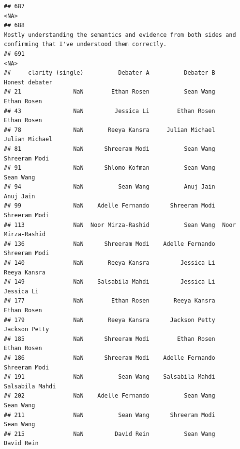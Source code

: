 \documentclass[
]{article}
\begin{document}
\begin{verbatim}
## 687                                                                                                                                                                                                                                                                                                                                                <NA>
## 688                                                                                                                                                                                                                                 Mostly understanding the semantics and evidence from both sides and confirming that I've understood them correctly.
## 691                                                                                                                                                                                                                                                                                                                                                <NA>
##     clarity (single)          Debater A          Debater B     Honest debater
## 21               NaN        Ethan Rosen          Sean Wang        Ethan Rosen
## 43               NaN         Jessica Li        Ethan Rosen        Ethan Rosen
## 78               NaN       Reeya Kansra     Julian Michael     Julian Michael
## 81               NaN      Shreeram Modi          Sean Wang      Shreeram Modi
## 91               NaN      Shlomo Kofman          Sean Wang          Sean Wang
## 94               NaN          Sean Wang          Anuj Jain          Anuj Jain
## 99               NaN    Adelle Fernando      Shreeram Modi      Shreeram Modi
## 113              NaN  Noor Mirza-Rashid          Sean Wang  Noor Mirza-Rashid
## 136              NaN      Shreeram Modi    Adelle Fernando      Shreeram Modi
## 140              NaN       Reeya Kansra         Jessica Li       Reeya Kansra
## 149              NaN    Salsabila Mahdi         Jessica Li         Jessica Li
## 177              NaN        Ethan Rosen       Reeya Kansra        Ethan Rosen
## 179              NaN       Reeya Kansra      Jackson Petty      Jackson Petty
## 185              NaN      Shreeram Modi        Ethan Rosen        Ethan Rosen
## 186              NaN      Shreeram Modi    Adelle Fernando      Shreeram Modi
## 191              NaN          Sean Wang    Salsabila Mahdi    Salsabila Mahdi
## 202              NaN    Adelle Fernando          Sean Wang          Sean Wang
## 211              NaN          Sean Wang      Shreeram Modi          Sean Wang
## 215              NaN         David Rein          Sean Wang         David Rein

\end{verbatim}
\end{document}
